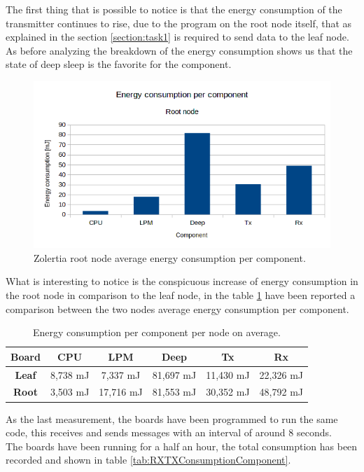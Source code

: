 \documentclass[conference]{IEEEtran}
\begin{document}
The first thing that is possible to notice is that the energy consumption of the transmitter continues to rise, due to the program on the root node itself, that as explained in the section \ref{section:task1} is required to send data to the leaf node.\\
As before analyzing the breakdown of the energy consumption shows us that the state of deep sleep is the favorite for the component.
\begin{figure}[]
	\centering
	\includegraphics[width=.5\textwidth,keepaspectratio]{TXConsumptionComponent.png}
	\caption{Zolertia root node average energy consumption per component.}
	\label{fig:TXConsumptionComponent}
\end{figure}
What is interesting to notice is the conspicuous increase of energy consumption in the root node in comparison to the leaf node, in the table \ref{tab:nodeEnergyComparison1} have been reported a comparison between the two nodes average energy consumption per component.
\begin{table}[H]
	\begin{center}
		\begin{tabular}{cccccc}
			\hline
			\textbf{Board} & \textbf{CPU} & \textbf{LPM} & \textbf{Deep} & \textbf{Tx} & \textbf{Rx} \\ \hline
			\textbf{Leaf}  & 8,738 mJ        & 7,337 mJ       & 81,697 mJ       & 11,430 mJ     & 22,326 mJ     \\
			\textbf{Root}  & 3,503 mJ       & 17,716 mJ      & 81,553 mJ       & 30,352 mJ     & 48,792 mJ     \\ \hline
		\end{tabular}
	\end{center}
	\caption{Energy consumption per component per node on average.}
	\label{tab:nodeEnergyComparison1}
\end{table}
As the last measurement, the boards have been programmed to run the same code, this receives and sends messages with an interval of around 8 seconds.\\
The boards have been running for a half an hour, the total consumption has been recorded and shown in table \ref{tab:RXTXConsumptionComponent}.\\
\end{document}

